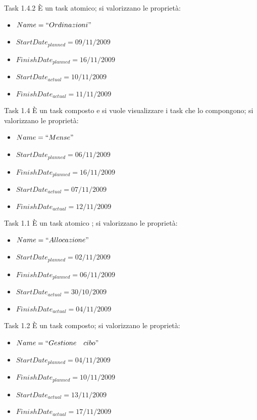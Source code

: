 \begin{taksDef}{Task 1.4.2} \`E un task atomico; si valorizzano le propriet\`a:
\begin{itemize}
  \item $Name = ``Ordinazioni"$
  \item $StartDate_{planned} = 09/11/2009$
  \item $FinishDate_{planned} = 16/11/2009$
  \item $StartDate_{actual} = 10/11/2009$
  \item $FinishDate_{actual} = 11/11/2009$
\end{itemize}
\end{taksDef}

\begin{taksDef}{Task 1.4} \`E un task composto e si vuole visualizzare i task che lo
compongono; si valorizzano le propriet\`a:
\begin{itemize}
  \item $Name = ``Mense"$
  \item $StartDate_{planned} = 06/11/2009$
  \item $FinishDate_{planned} = 16/11/2009$
  \item $StartDate_{actual} = 07/11/2009$
  \item $FinishDate_{actual} = 12/11/2009$
\end{itemize}
\end{taksDef}

\begin{taksDef}{Task 1.1} \`E un task atomico
; si valorizzano le propriet\`a:
\begin{itemize}
  \item $Name = ``Allocazione"$
  \item $StartDate_{planned} = 02/11/2009$
  \item $FinishDate_{planned} = 06/11/2009$
  \item $StartDate_{actual} = 30/10/2009$
  \item $FinishDate_{actual} = 04/11/2009$
\end{itemize}
\end{taksDef}

\begin{taksDef}{Task 1.2} \`E un task composto; si valorizzano le propriet\`a:
\begin{itemize}
  \item $Name = ``Gestione\quad cibo"$
  \item $StartDate_{planned} = 04/11/2009$
  \item $FinishDate_{planned} = 10/11/2009$
  \item $StartDate_{actual} = 13/11/2009$
  \item $FinishDate_{actual} = 17/11/2009$
\end{itemize}
\end{taksDef}

